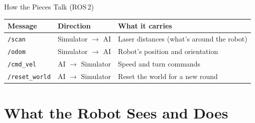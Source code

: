 \documentclass[aspectratio=169, 11pt]{beamer}
\begin{document}
\begin{frame}{How the Pieces Talk (ROS\,2)}
  \vspace{0.4em}

  \begin{center}
  \small
  \renewcommand{\arraystretch}{1.15}
  \begin{tabular}{lll}
    \toprule
    \textbf{Message} & \textbf{Direction} & \textbf{What it carries}\\
    \midrule
    \texttt{/scan} & Simulator $\rightarrow$ AI &
      Laser distances (what's around the robot)\\
    \texttt{/odom} & Simulator $\rightarrow$ AI &
      Robot's position and orientation\\
    \texttt{/cmd\_vel} & AI $\rightarrow$ Simulator &
      Speed and turn commands\\
    \texttt{/reset\_world} & AI $\rightarrow$ Simulator &
      Reset the world for a new round\\
    \bottomrule
  \end{tabular}
  \end{center}
\end{frame}

\section{What the Robot Sees and Does}
\end{document}
